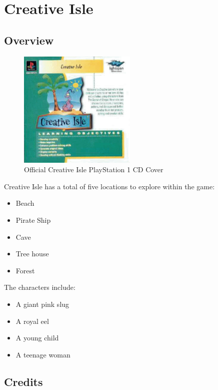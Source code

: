 \chapter{Creative Isle}

\section{Overview}

\begin{figure}[H]
    \centering
    \includegraphics[width=0.5\textwidth]{"./Games/Creative/Images/CreativeIsleCDCover.jpg"}
    \caption{Official Creative Isle PlayStation 1 CD Cover}
\end{figure}

Creative Isle has a total of five locations to explore within the game:

\begin{itemize}
    \item Beach
    \item Pirate Ship
    \item Cave
    \item Tree house
    \item Forest
\end{itemize}

The characters include:
\begin{itemize}
    \item A giant pink slug
    \item A royal eel
    \item A young child
    \item A teenage woman
\end{itemize}

\section{Credits}

